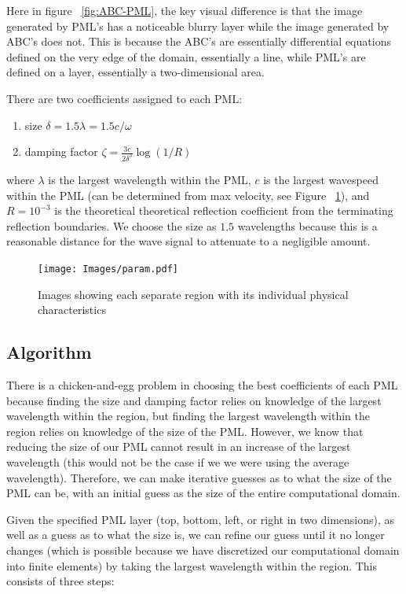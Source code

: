 Here in figure ~\ref{fig:ABC-PML}, the key visual difference is that the image generated by PML's has a noticeable blurry layer while the image generated by ABC's does not. This is because the ABC's are essentially differential equations defined on the very edge of the domain, essentially a line, while PML's are defined on a layer, essentially a two-dimensional area.


There are two coefficients assigned to each PML:
\begin{enumerate}
\item size $\delta = 1.5 \lambda = 1.5 c / \omega$
\item damping factor $\zeta = \frac{3c}{2\delta^3} \log(1/R)$
\end{enumerate}
where $\lambda$ is the largest wavelength within the PML, $c$ is the largest wavespeed within the PML (can be determined from max velocity, see Figure ~\ref{fig:physical-characteristics}), and $R = 10^{-3}$ is the theoretical theoretical reflection coefficient from the terminating reflection boundaries. We choose the size as $1.5$ wavelengths because this is a reasonable distance for the wave signal to attenuate to a negligible amount.

\begin{figure}[ht]
	\texttt{[image: Images/param.pdf]}
	\caption{Images showing each separate region with its individual physical characteristics}
	\label{fig:physical-characteristics}
\end{figure}

\subsection{Algorithm}

There is a chicken-and-egg problem in choosing the best coefficients of each PML because finding the size and damping factor relies on knowledge of the largest wavelength within the region, but finding the largest wavelength within the region relies on knowledge of the size of the PML. However, we know that reducing the size of our PML cannot result in an increase of the largest wavelength (this would not be the case if we we were using the average wavelength). Therefore, we can make iterative guesses as to what the size of the PML can be, with an initial guess as the size of the entire computational domain.

Given the specified PML layer (top, bottom, left, or right in two dimensions), as well as a guess as to what the size is, we can refine our guess until it no longer changes (which is possible because we have discretized our computational domain into finite elements) by taking the largest wavelength within the region. This consists of three steps:

